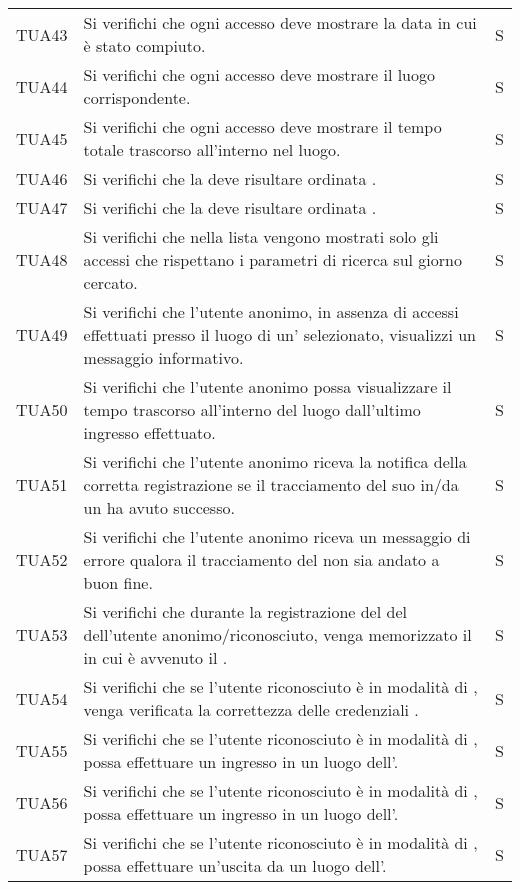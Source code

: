 {\begin{longtable}{ c C{13cm} C{1cm}}
TUA43 & Si verifichi che ogni accesso deve mostrare la data in cui è stato compiuto. & S \\
TUA44 & Si verifichi che ogni accesso deve mostrare il luogo corrispondente. & S \\
TUA45 & Si verifichi che ogni accesso deve mostrare il tempo totale trascorso all'interno nel luogo. & S \\
TUA46 & Si verifichi che la  deve risultare ordinata . & S \\
TUA47 & Si verifichi che la  deve risultare ordinata . & S \\
TUA48 & Si verifichi che nella lista vengono mostrati solo gli accessi che rispettano i parametri di ricerca sul giorno cercato. & S \\
TUA49 & Si verifichi che l'utente anonimo, in assenza di accessi effettuati presso il luogo di un' selezionato, visualizzi un messaggio informativo. & S \\
TUA50 & Si verifichi che l'utente anonimo possa visualizzare il tempo trascorso all'interno del luogo dall'ultimo ingresso effettuato. & S \\
TUA51 & Si verifichi che l’utente anonimo riceva la notifica della corretta registrazione se il tracciamento del suo  in/da un  ha avuto successo. & S \\
TUA52 & Si verifichi che l’utente anonimo riceva un messaggio di errore qualora il tracciamento del  non sia andato a buon fine. & S \\
TUA53 & Si verifichi che durante la registrazione del  del  dell'utente anonimo/riconosciuto, venga memorizzato il  in cui è avvenuto il . & S \\
TUA54 & Si verifichi che se l'utente riconosciuto è in modalità di , venga verificata la correttezza delle credenziali . & S \\
TUA55 & Si verifichi che se l'utente riconosciuto è in modalità di , possa effettuare un ingresso in un luogo dell'. & S \\
TUA56 & Si verifichi che se l'utente riconosciuto è in modalità di , possa effettuare un ingresso in un luogo dell'. & S \\
TUA57 & Si verifichi che se l'utente riconosciuto è in modalità di , possa effettuare un'uscita da un luogo dell'. & S \\

\end{longtable}}
